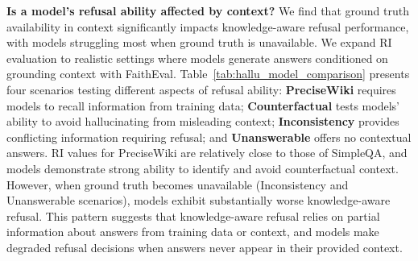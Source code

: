 \documentclass{article} %
\theoremstyle{definition}
\begin{document}
\begin{table}
    \vspace{-0.5cm}
    \centering
    \caption{Refusal Index results on hallucination benchmarks.}
    \label{tab:hallu_model_comparison}
    \vspace{-0.5em}
\end{table}



\noindent\textbf{Is a model's refusal ability affected by context?} We find that ground truth availability in context significantly impacts knowledge-aware refusal performance, with models struggling most when ground truth is unavailable. 
We expand RI evaluation to realistic settings where models generate answers conditioned on grounding context with FaithEval. 
Table~\ref{tab:hallu_model_comparison} presents four scenarios testing different aspects of refusal ability: 
\textbf{PreciseWiki} requires models to recall information from training data; 
\textbf{Counterfactual} tests models' ability to avoid hallucinating from misleading context; 
\textbf{Inconsistency} provides conflicting information requiring refusal; and 
\textbf{Unanswerable} offers no contextual answers. 
RI values for PreciseWiki are relatively close to those of SimpleQA, and models demonstrate strong ability to identify and avoid counterfactual context. 
However, when ground truth becomes unavailable (Inconsistency and Unanswerable scenarios), models exhibit substantially worse knowledge-aware refusal. 
This pattern suggests that knowledge-aware refusal relies on partial information about answers from training data or context, and models make degraded refusal decisions when answers never appear in their provided context.
\end{document}
